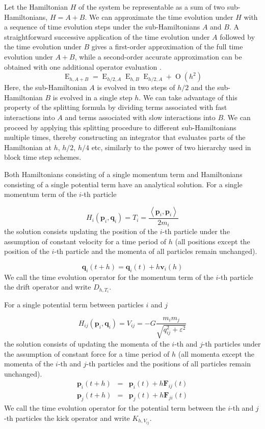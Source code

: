 \documentclass[referee]{aa}
\begin{document}
Let the Hamiltonian $H$ of the system be representable as a sum of
two sub-Hamiltonians, $H=A+B$. We can approximate the time evolution
under $H$ with a sequence of time evolution steps under the sub-Hamiltonians
$A$ and $B$. A straightforward successive application of the time
evolution under $A$ followed by the time evolution under $B$ gives
a first-order approximation of the full time evolution under $A+B$,
while a second-order accurate approximation can be obtained with one
additional operator evaluation \cite[Sec 12.4]{SSC94}.
\begin{equation}
\operatorname{E}_{h,A+B}=\operatorname{E}_{h/2,A}\operatorname{E}_{h,B}\operatorname{E}_{h/2,A}+\operatorname{O}\left(h^{2}\right)\label{eq:second-order-kick}
\end{equation}
Here, the sub-Hamiltonian $A$ is evolved in two steps of $h/2$ and
the sub-Hamiltonian $B$ is evolved in a single step $h$. We can
take advantage of this property of the splitting formula by dividing
terms associated with fast interactions into $A$ and terms associated
with slow interactions into $B$. We can proceed by applying this
splitting procedure to different sub-Hamiltonians multiple times,
thereby constructing an integrator that evaluates parts of the Hamiltonian
at $h$, $h/2$, $h/4$ etc, similarly to the power of two hierarchy
used in block time step schemes.

Both Hamiltonians consisting of a single momentum term and Hamiltonians
consisting of a single potential term have an analytical solution.
For a single momentum term of the $i$-th particle

\[
H_{i}(\mathbf{p}_{i},\mathbf{q}_{i})=T_{i}=\frac{\left\langle \mathbf{p}_{i},\mathbf{p}_{i}\right\rangle }{2m_{i}}
\]
the solution consists updating the position of the $i$-th particle
under the assumption of constant velocity for a time period of $h$
(all positions except the position of the $i$-th particle and the
momenta of all particles remain unchanged). 

\[
\mathbf{q}_{i}(t+h)=\mathbf{q}_{i}(t)+h\mathbf{v}_{i}(h)
\]
We call the time evolution operator for the momentum term of the $i$-th
particle the drift operator and write $D_{h,T_{i}}$.

For a single potential term between particles $i$ and $j$

\[
H_{ij}(\mathbf{p}_{i},\mathbf{q}_{i})=V_{ij}=-G\frac{m_{i}m_{j}}{\sqrt{q_{ij}^{2}+\varepsilon^{2}}}
\]
the solution consists of updating the momenta of the $i$-th and $j$-th
particles under the assumption of constant force for a time period
of $h$ (all momenta except the momenta of the $i$-th and $j$-th
particles and the positions of all particles remain unchanged). 
\begin{eqnarray*}
\mathbf{p}_{i}(t+h) & = & \mathbf{p}_{i}(t)+h\mathbf{F}_{ij}(t)\\
\mathbf{p}_{j}(t+h) & = & \mathbf{p}_{j}(t)+h\mathbf{F}_{ji}(t)
\end{eqnarray*}
 We call the time evolution operator for the potential term between
the $i$-th and $j$-th particles the kick operator and write $K_{h,V_{ij}}$.
\end{document}
